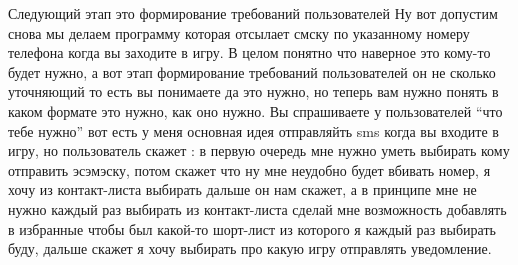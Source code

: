 {Следующий этап это формирование требований пользователей
Ну вот допустим снова мы делаем программу которая отсылает смску по указанному номеру телефона когда вы заходите в игру. В целом понятно что наверное это кому-то будет нужно, а вот этап формирование требований пользователей он не сколько уточняющий то есть вы понимаете да это нужно, но теперь вам нужно понять в каком формате это нужно, как оно нужно. Вы спрашиваете у пользователей ``что тебе нужно''  вот есть у меня основная идея отправляйть sms когда вы входите в игру, но пользователь скажет : в первую очередь мне нужно уметь выбирать кому отправить эсэмэску, потом  скажет что ну мне неудобно будет вбивать номер, я хочу из  контакт-листа выбирать дальше он нам скажет, а в принципе мне не нужно каждый раз выбирать из контакт-листа сделай мне возможность добавлять в избранные чтобы был какой-то шорт-лист из которого я каждый раз выбирать буду, дальше скажет я хочу  выбирать про какую игру отправлять уведомление.
}
